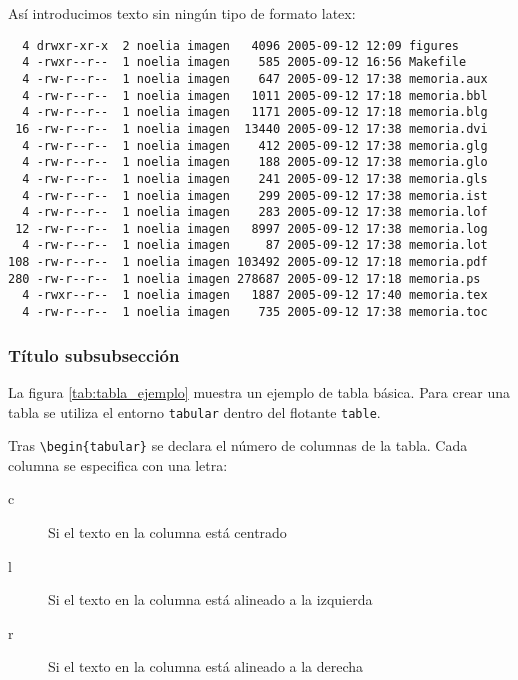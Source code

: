 Así introducimos texto sin ningún tipo de formato latex:
\begin{verbatim}
  4 drwxr-xr-x  2 noelia imagen   4096 2005-09-12 12:09 figures
  4 -rwxr--r--  1 noelia imagen    585 2005-09-12 16:56 Makefile
  4 -rw-r--r--  1 noelia imagen    647 2005-09-12 17:38 memoria.aux
  4 -rw-r--r--  1 noelia imagen   1011 2005-09-12 17:18 memoria.bbl
  4 -rw-r--r--  1 noelia imagen   1171 2005-09-12 17:18 memoria.blg
 16 -rw-r--r--  1 noelia imagen  13440 2005-09-12 17:38 memoria.dvi
  4 -rw-r--r--  1 noelia imagen    412 2005-09-12 17:38 memoria.glg
  4 -rw-r--r--  1 noelia imagen    188 2005-09-12 17:38 memoria.glo
  4 -rw-r--r--  1 noelia imagen    241 2005-09-12 17:38 memoria.gls
  4 -rw-r--r--  1 noelia imagen    299 2005-09-12 17:38 memoria.ist
  4 -rw-r--r--  1 noelia imagen    283 2005-09-12 17:38 memoria.lof
 12 -rw-r--r--  1 noelia imagen   8997 2005-09-12 17:38 memoria.log
  4 -rw-r--r--  1 noelia imagen     87 2005-09-12 17:38 memoria.lot
108 -rw-r--r--  1 noelia imagen 103492 2005-09-12 17:18 memoria.pdf
280 -rw-r--r--  1 noelia imagen 278687 2005-09-12 17:18 memoria.ps
  4 -rwxr--r--  1 noelia imagen   1887 2005-09-12 17:40 memoria.tex
  4 -rw-r--r--  1 noelia imagen    735 2005-09-12 17:38 memoria.toc
\end{verbatim}



\subsubsection{Título subsubsección}

La figura \ref{tab:tabla_ejemplo} muestra un ejemplo de tabla básica. Para crear una tabla se utiliza el entorno \texttt{tabular} dentro del flotante \texttt{table}. 


Tras \texttt{\textbackslash begin\{tabular\}} se declara el número de columnas de la tabla. Cada columna se especifica con una letra:
\begin{description}
 \item [c] Si el texto en la columna está centrado
 \item [l] Si el texto en la columna está alineado a la izquierda
 \item [r] Si el texto en la columna está alineado a la derecha
\end{description}

